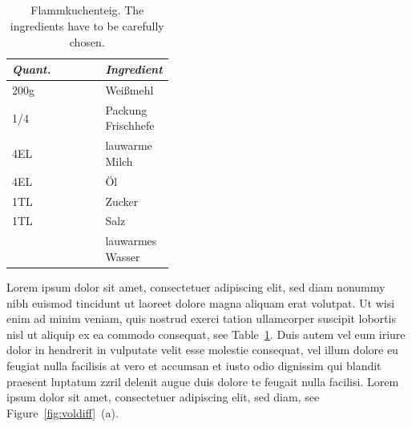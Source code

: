 \subsection{}

\begin{table}
    \centering
    \begin{tabular}{|l|p{0.4\linewidth}|}
    \hline
    \emph{Quant.} & \emph{Ingredient}\\
    \hline
		200g &Wei{\ss}mehl\\
		1/4  &Packung Frischhefe\\
		4EL  &lauwarme Milch\\
		4EL  &Öl\\
		1TL  &Zucker\\
		1TL  &Salz\\
		&lauwarmes Wasser\\
    \hline
    \end{tabular}
    \caption[Flammkuchenteig]{Flammkuchenteig. The ingredients have to be carefully chosen.\label{tab:mytable}}
\end{table}
%
Lorem ipsum dolor sit amet, consectetuer adipiscing elit, sed diam nonummy nibh euismod tincidunt ut laoreet dolore magna aliquam erat volutpat. Ut wisi enim ad minim veniam, quis nostrud exerci tation ullamcorper suscipit lobortis nisl ut aliquip ex ea commodo consequat, see Table~\ref{tab:mytable}. Duis autem vel eum iriure dolor in hendrerit in vulputate velit esse molestie consequat, vel illum dolore eu feugiat nulla facilisis at vero et accumsan et iusto odio dignissim qui blandit praesent luptatum zzril delenit augue duis dolore te feugait nulla facilisi. Lorem ipsum dolor sit amet, consectetuer adipiscing elit, sed diam,
see Figure~\ref{fig:voldiff}~(a).
%
